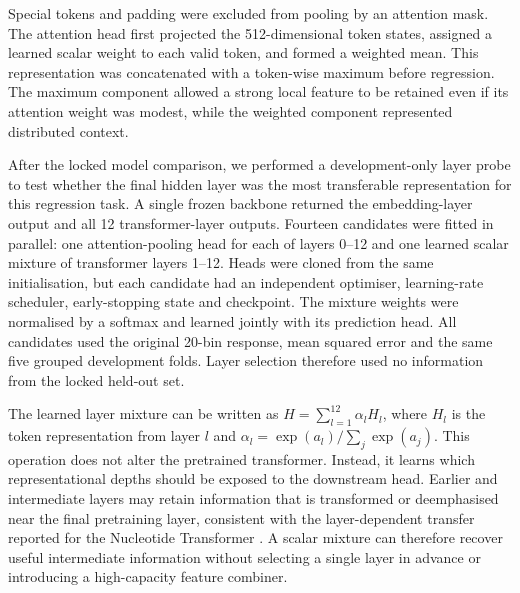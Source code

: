\documentclass[a4paper,12pt]{article}
\begin{document}
Special tokens and padding were excluded from pooling by an attention mask. The attention head first projected the 512-dimensional token states, assigned a learned scalar weight to each valid token, and formed a weighted mean. This representation was concatenated with a token-wise maximum before regression. The maximum component allowed a strong local feature to be retained even if its attention weight was modest, while the weighted component represented distributed context.

After the locked model comparison, we performed a development-only layer probe to test whether the final hidden layer was the most transferable representation for this regression task. A single frozen backbone returned the embedding-layer output and all 12 transformer-layer outputs. Fourteen candidates were fitted in parallel: one attention-pooling head for each of layers 0--12 and one learned scalar mixture of transformer layers 1--12. Heads were cloned from the same initialisation, but each candidate had an independent optimiser, learning-rate scheduler, early-stopping state and checkpoint. The mixture weights were normalised by a softmax and learned jointly with its prediction head. All candidates used the original 20-bin response, mean squared error and the same five grouped development folds. Layer selection therefore used no information from the locked held-out set.

The learned layer mixture can be written as $H=\sum_{l=1}^{12}\alpha_l H_l$, where $H_l$ is the token representation from layer $l$ and $\alpha_l=\exp(a_l)/\sum_j\exp(a_j)$. This operation does not alter the pretrained transformer. Instead, it learns which representational depths should be exposed to the downstream head. Earlier and intermediate layers may retain information that is transformed or deemphasised near the final pretraining layer, consistent with the layer-dependent transfer reported for the Nucleotide Transformer \citep{dallatorre2024nt}. A scalar mixture can therefore recover useful intermediate information without selecting a single layer in advance or introducing a high-capacity feature combiner.
\end{document}
